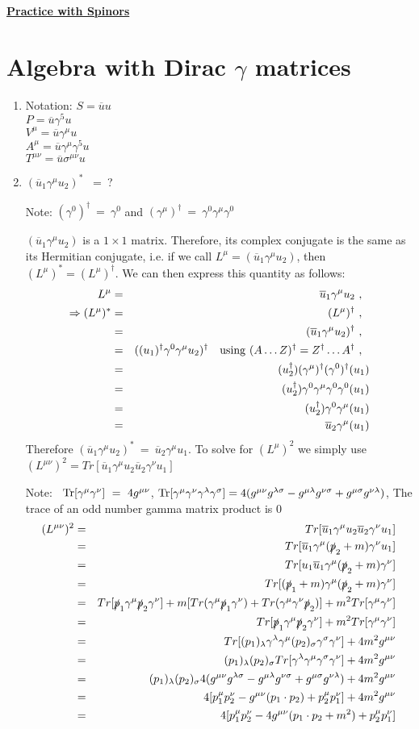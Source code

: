 \documentclass[12pt]{article}
\def \bea{\begin{eqnarray}}
\def \eea{\end{eqnarray}}
\def \Tr{{\rm Tr}}
\def \nn{\nonumber}
\def \nl{\nn \\}
\def \ou{\overline{u}}
\def \ga{\gamma}
\def \la{\lambda}
\def \si{\sigma}
\begin{document}
\begin{center}
\underline{\textbf{\Large Practice with Spinors}}
\end{center}

\section{Algebra with Dirac $\ga$ matrices}


\begin{enumerate}
\item Notation: $S= \ou u$ \\
$P=\ou \ga^5 u$ \\
$V^\mu = \ou \ga^\mu u$ \\ 
$A^\mu = \ou \ga^\mu \ga^5 u $ \\
$T^{\mu\nu} = \ou \si^{\mu\nu} u$

\item$(\ou_1\ga^\mu u_2)^*$ ~=~?

Note: $(\ga^0)^\dag~=~\ga^0$ and $(\ga^\mu)^\dag~=~ \ga^0\ga^\mu\ga^0$

$(\ou_1\ga^\mu u_2)$ is a $1\times1$ matrix. Therefore, its complex conjugate is the same as its Hermitian conjugate, i.e. if we call
$L^\mu = (\ou_1\ga^\mu u_2)$, then $(L^\mu)^* = (L^\mu)^\dag$. We can then express this quantity as follows:
\bea
L^\mu &=& \ou_1\ga^\mu u_2 ~,~~ \\
\Rightarrow (L^\mu)^* &=& (L^\mu)^\dag ~,~~ \nl 
&=& (\ou_1\ga^\mu u_2)^\dag ~,~~ \nl 
&=& ((u_1)^\dag\ga^0\ga^\mu u_2)^\dag ~~~{\rm using}~(A\ldots Z)^\dag = Z^\dag\ldots A^\dag ~,~~ \nl 
&=& (u_2^\dag)(\ga^\mu)^\dag(\ga^0)^\dag(u_1)\nl 
&=& (u_2^\dag)\ga^0\ga^\mu\ga^0\ga^0(u_1)\nl
&=& (u_2^\dag)\ga^0\ga^\mu(u_1)\nl
&=& \ou_2\ga^\mu(u_1) 
\eea
Therefore $(\ou_1\ga^\mu u_2)^*~=~\ou_2\ga^\mu u_1 $. To solve for $(L^\mu)^2$ we simply use $(L^{\mu\nu})^2 = Tr[\ou_1 \ga^\mu u_2 \ou_2 \ga^\nu u_1]$

Note: ~$\Tr[\ga^\mu\ga^\nu]~=~4 g^{\mu\nu}$, $\Tr[\ga^\mu \ga^\nu \ga^\la \ga^\si]= 4(g^{\mu\nu}g^{\la\si} - g^{\mu\la} g^{\nu\si} + g^{\mu\si}g^{\nu\la})$, The trace of an odd number gamma matrix product is 0 
\bea
(L^{\mu\nu})^2 &=& Tr[\ou_1 \ga^\mu u_2 \ou_2 \ga^\nu u_1] \\
&=& Tr[\ou_1 \ga^\mu (\slashed{p}_2+m) \ga^\nu u_1] \nl 
&=& Tr[u_1\ou_1 \ga^\mu (\slashed{p}_2+m) \ga^\nu] \nl  
&=& Tr[(\slashed{p}_1+m) \ga^\mu (\slashed{p}_2+m) \ga^\nu] \nl 
&=& Tr[\slashed{p}_1\ga^\mu \slashed{p}_2 \ga^\nu] + m[Tr(\ga^\mu \slashed{p}_1\ga^\nu) + Tr(\ga^\mu \ga^\nu \slashed{p}_2)] + m^2Tr[\ga^\mu \ga^\nu]\nl 
&=& Tr[\slashed{p}_1\ga^\mu \slashed{p}_2 \ga^\nu] + m^2Tr[\ga^\mu \ga^\nu] \nl 
&=& Tr[(p_1)_\la\ga^\la \ga^\mu (p_2)_\si\ga^\si \ga^\nu  ] + 4m^2g^{\mu\nu} \nl 
&=& (p_1)_\la (p_2)_\si Tr[\ga^\la \ga^\mu\ga^\si \ga^\nu  ] + 4m^2g^{\mu\nu} \nl 
&=& (p_1)_\la(p_2)_\si 4(g^{\mu\nu}g^{\la\si} - g^{\mu\la} g^{\nu\si} + g^{\mu\si}g^{\nu\la}) + 4m^2g^{\mu\nu}\nl 
&=& 4[p_1^\mu p_2^\nu - g^{\mu\nu}(p_1 \cdot p_2) + p_2^\mu p_1^\nu] + 4m^2g^{\mu\nu} \nl
&=& 4[p_1^\mu p_2^\nu - 4g^{\mu\nu}(p_1 \cdot p_2 + m^2) + p_2^\mu p_1^\nu]
\eea


\end{enumerate}
\end{document}
